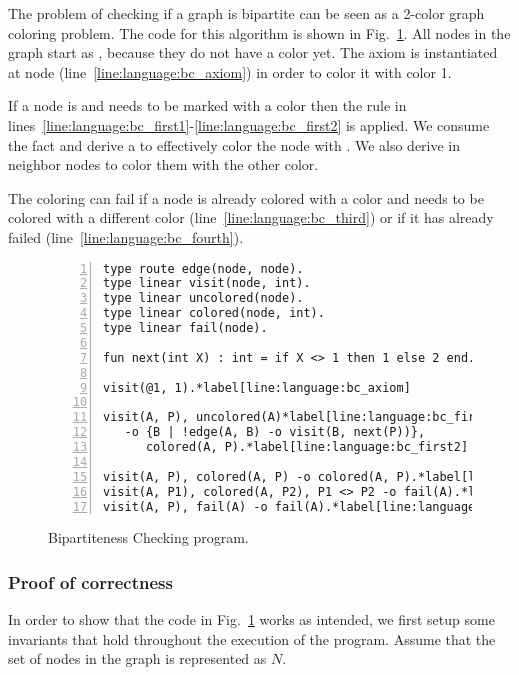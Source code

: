 The problem of checking if a graph is bipartite can be seen as a 2-color graph
coloring problem.  The code for this algorithm is shown in
Fig.~\ref{language:code:bichecking}. All nodes in the graph start as
, because they do not have a color yet. The axiom
 is instantiated at node 
(line~\ref{line:language:bc_axiom}) in order to color it with color 1.

If a node is  and needs to be marked with a color 
then the rule in
lines~\ref{line:language:bc_first1}-\ref{line:language:bc_first2} is applied. We
consume the  fact and derive a  to
effectively color the node with . We also derive  in neighbor nodes to color them with the other color. 

The coloring can fail if a node is already colored with a color  and
needs to be colored with a different color (line~\ref{line:language:bc_third})
or if it has already failed (line~\ref{line:language:bc_fourth}).

\begin{figure}[h!]
\begin{Verbatim}[numbers=left,fontsize=\codesize,commandchars=\*\[\]]
type route edge(node, node).
type linear visit(node, int).
type linear uncolored(node).
type linear colored(node, int).
type linear fail(node).

fun next(int X) : int = if X <> 1 then 1 else 2 end.

visit(@1, 1).*label[line:language:bc_axiom]

visit(A, P), uncolored(A)*label[line:language:bc_first1]
   -o {B | !edge(A, B) -o visit(B, next(P))},
      colored(A, P).*label[line:language:bc_first2]

visit(A, P), colored(A, P) -o colored(A, P).*label[line:language:bc_second]
visit(A, P1), colored(A, P2), P1 <> P2 -o fail(A).*label[line:language:bc_third]
visit(A, P), fail(A) -o fail(A).*label[line:language:bc_fourth]
\end{Verbatim}
  \caption{Bipartiteness Checking program.}
  \label{language:code:bichecking}
\end{figure}

\subsubsection{Proof of correctness}

In order to show that the code in Fig.~\ref{language:code:bichecking} works as
intended, we first setup some invariants that hold throughout the execution of
the program. Assume that the set of nodes in the graph is represented as $N$.

